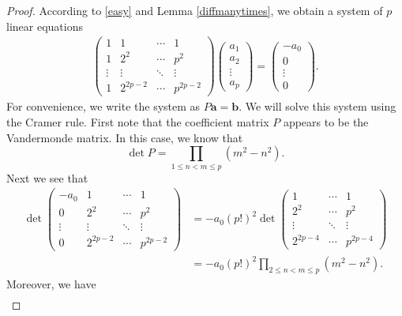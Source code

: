 \documentclass[10pt,a4paper]{amsart}
\begin{document}
\begin{proof}
    According to \eqref{easy} and Lemma \ref{diffmanytimes}, we obtain a system of $p$ linear equations
    \begin{align*}
        \begin{pmatrix}
            1 & 1 & \cdots & 1\\
            1 & 2^2 & \cdots & p^2\\
            \vdots & \vdots & \ddots & \vdots\\
            1 & 2^{2p-2} & \cdots & p^{2p-2}
        \end{pmatrix}
        \begin{pmatrix}
            a_1 \\ a_2 \\ \vdots \\ a_p
        \end{pmatrix}=\begin{pmatrix}
            -a_0 \\ 0 \\ \vdots \\ 0
        \end{pmatrix}.
    \end{align*}
    For convenience, we write the system as $P\mathbf{a}=\mathbf{b}$. We will solve this system using the Cramer rule. First note that the coefficient matrix $P$ appears to be the Vandermonde matrix. In this case, we know that
    \[\det P=\prod_{1\le n<m\le p}(m^2-n^2).\]
    Next we see that
    \begin{align*}
        \det\begin{pmatrix}
            -a_0 & 1 & \cdots & 1\\
            0 & 2^2 & \cdots & p^2\\
            \vdots & \vdots & \ddots & \vdots\\
            0 & 2^{2p-2} & \cdots & p^{2p-2}
        \end{pmatrix}
        &=-a_0(p!)^2\det\begin{pmatrix}
            1 & \cdots & 1\\
            2^2 & \cdots & p^2\\
            \vdots & \ddots & \vdots\\
            2^{2p-4} & \cdots & p^{2p-4}
        \end{pmatrix}\\
        &=-a_0(p!)^2\prod_{2\le n<m\le p}(m^2-n^2).
    \end{align*}
    Moreover, we have
    \begin{align*}

\end{align*}
\end{proof}
\end{document}
